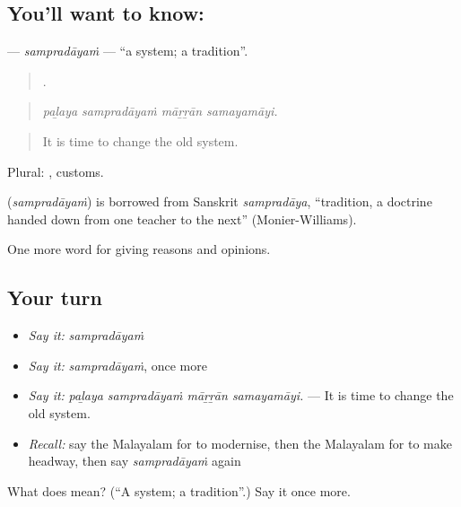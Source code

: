 \subsection*{You'll want to know: }
\textbf{} — \emph{sampradāyaṁ} — \textquotedblleft{}a system; a tradition\textquotedblright{}.

\begin{quote}
   .
\end{quote}

\begin{quote}
\emph{paḻaya sampradāyaṁ māṟṟān samayamāyi.}
\end{quote}

\begin{quote}
It is time to change the old system.
\end{quote}

Plural: , customs.

\begin{cousinweb}
\textbf{} (\emph{sampradāyaṁ}) is borrowed from Sanskrit \emph{sampradāya}, \textquotedblleft{}tradition, a doctrine handed down from one teacher to the next\textquotedblright{} (Monier-Williams).
\end{cousinweb}

\begin{grammarlens}[title={What you've built}]
One more word for giving reasons and opinions.
\end{grammarlens}

\subsection*{Your turn}
\begin{itemize}
\raggedright
  \item \emph{Say it:} \emph{sampradāyaṁ}
  \item \emph{Say it:} \emph{sampradāyaṁ}, once more
  \item \emph{Say it:} \emph{paḻaya sampradāyaṁ māṟṟān samayamāyi.} — It is time to change the old system.
  \item \emph{Recall:} say the Malayalam for to modernise, then the Malayalam for to make headway, then say \emph{sampradāyaṁ} again
\end{itemize}

\begin{tcolorbox}[breakable,colback=teal!4,colframe=teal!35!black,title={Before you move on}]
What does  mean? (\textquotedblleft{}A system; a tradition\textquotedblright{}.) Say it once more.
\end{tcolorbox}
